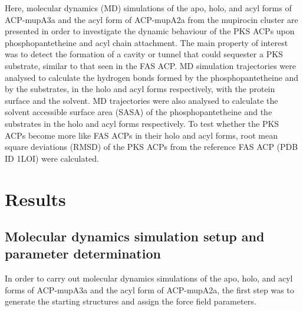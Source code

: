 Here, molecular dynamics (MD) simulations of the apo, holo, and acyl forms of ACP-mupA3a and the acyl form of ACP-mupA2a from the mupirocin cluster are presented in order to investigate the dynamic behaviour of the PKS ACPs upon phosphopantetheine and acyl chain attachment. The main property of interest was to detect the formation of a cavity or tunnel that could sequester a PKS substrate, similar to that seen in the FAS ACP. MD simulation trajectories were analysed to calculate the hydrogen bonds formed by the phosphopantetheine and by the substrates, in the holo and acyl forms respectively, with the protein surface and the solvent. MD trajectories were also analysed to calculate the solvent accessible surface area (SASA) of the phosphopantetheine and the substrates in the holo and acyl forms respectively. %
To test whether the PKS ACPs become more like FAS ACPs in their holo and acyl forms, root mean square deviations (RMSD) of the PKS ACPs from the reference FAS ACP (PDB ID 1LOI) were calculated. %

\section{Results}
\label{sec:Chap5Results}

	\subsection{Molecular dynamics simulation setup and parameter determination}
	\label{sec:simSetup}
	In order to carry out molecular dynamics simulations of the apo, holo, and acyl forms of ACP-mupA3a and the acyl form of ACP-mupA2a, the first step was to generate the starting structures and assign the force field parameters. 
	
